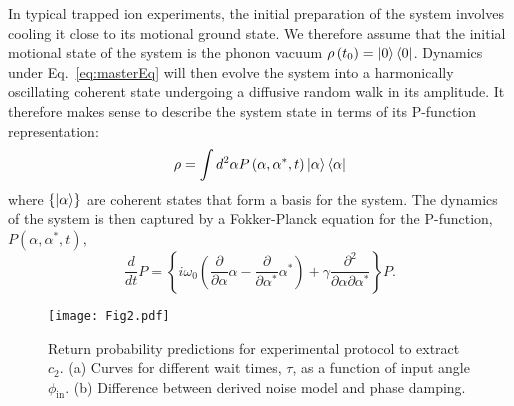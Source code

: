 \documentclass[prx,aps,twocolumn,showpacs,superscriptaddress,10pt]{revtex4-1}
\begin{document}
In typical trapped ion experiments, the initial preparation of the system involves cooling it close to its motional ground state. We therefore assume that the initial motional state of the system is the phonon vacuum $\rho\left(t_{0}\right)=\ket{0}\bra{0}$. Dynamics under Eq.~\eqref{eq:masterEq} will then evolve the system into a harmonically oscillating coherent state undergoing a diffusive random walk in its amplitude. It therefore makes sense to describe the system state in terms of its P-function representation:
\begin{equation}\label{eq:Pfunc}
	\rho = \int d^{2}\alpha P\left(\alpha,\alpha^{*},t\right)\ket{\alpha}\bra{\alpha}
\end{equation}
where $\{\ket{\alpha}\}$ are coherent states that form a basis for the system. The dynamics of the system is then captured by a Fokker-Planck equation for the P-function, $P\left(\alpha,\alpha^{*},t\right)$,
\begin{equation}\label{eq:FokkerPlanck}
	\frac{d}{dt}P = \left\{ i\omega_{0}\left(\frac{\partial}{\partial\alpha}\alpha - \frac{\partial}{\partial\alpha^{*}}\alpha^{*}\right) +\gamma\frac{\partial^2}{\partial\alpha\partial\alpha^{*}}\right\} P.
\end{equation} 


\begin{figure*}[t!]
	\centering
	\texttt{[image: Fig2.pdf]}
	\caption{Return probability predictions for experimental protocol to extract $c_{2}$. (a) Curves for different wait times, $\tau$, as a function of input angle $\phi_\textrm{in}$. (b) Difference between derived noise model and phase damping.}
	\label{fig:NoiseEcho}
\end{figure*}
\end{document}
